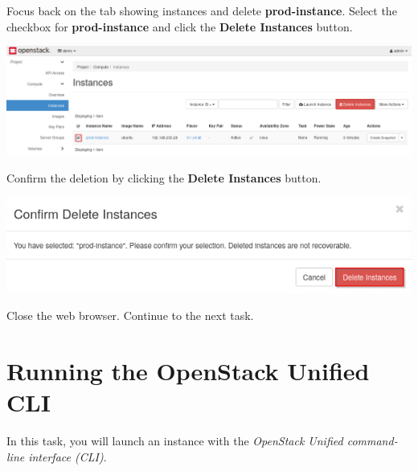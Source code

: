 \documentclass[letterpaper, 12pt]{article}
\begin{document}
\begin{enumerate}
    \begin{labstep}
        Focus back on the tab showing instances and delete \textbf{prod-instance}.
        Select the checkbox for \textbf{prod-instance} and click the \textbf{Delete Instances} button.

        \begin{center}
            \includegraphics[width=\linewidth]{images/part1/step16.png}
        \end{center}
    \end{labstep}

    \begin{labstep}
        Confirm the deletion by clicking the \textbf{Delete Instances} button.

        \begin{center}
            \includegraphics[width=\linewidth]{images/part1/step17.png}
        \end{center}
    \end{labstep}

    \begin{labstep}
        Close the web browser.
        Continue to the next task.
    \end{labstep}
\end{enumerate}

\section{Running the OpenStack Unified CLI}
In this task, you will launch an instance with the \textit{OpenStack Unified command-line interface (CLI)}.
\end{document}
